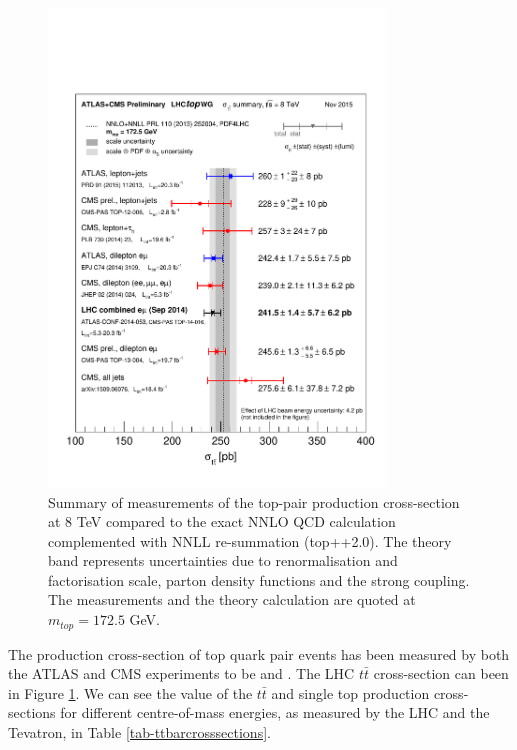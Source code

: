 \begin{figure} \label{fig-ttbarCombinedXsect}
\begin{center}
\includegraphics[width=0.8\textwidth]{Figures/ttbarCombinedXsect.pdf}
\end{center}
\caption{Summary of measurements of the top-pair production cross-section at 8 TeV compared to the exact NNLO QCD calculation complemented with NNLL re-summation (top++2.0). The theory band represents uncertainties due to renormalisation and factorisation scale, parton density functions and the strong coupling. The measurements and the theory calculation are quoted at $m_{top}=172.5$ GeV. \cite{ttbarXsectCombination}}
\end{figure}

The production cross-section of top quark pair events has been measured by both the ATLAS and CMS experiments to be  \cite{} and \cite{}. The LHC $t\bar{t}$ cross-section can been in Figure \ref{fig-ttbarCombinedXsect}. We can see the value of the $t\bar{t}$ and single top production cross-sections for different centre-of-mass energies, as measured by the LHC and the Tevatron, in Table \ref{tab-ttbarcrosssections}. 

